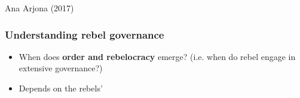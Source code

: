 \documentclass[aspectratio=43]{beamer}
\begin{document}
\begin{frame}
\begin{minipage}{0.29\textwidth}
  {\small Ana Arjona (2017)}
\end{minipage}

\end{frame}

\begin{frame}
\frametitle{Understanding rebel governance}
\centering

  \begin{itemize}
    \item When does \textbf{order and rebelocracy} emerge? (i.e. when do rebel engage in extensive governance?)
    \item Depends on the rebels' 
  \end{itemize}

\end{frame}
\end{document}
